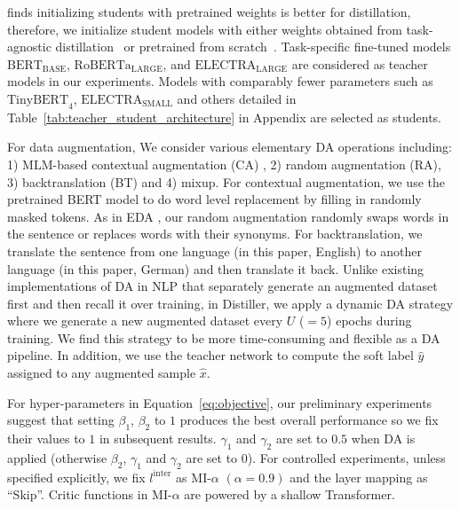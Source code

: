 \documentclass[11pt]{article}
\begin{document}
\citet{turc2019well} finds initializing students with pretrained weights is better for distillation, therefore, we initialize student models with either weights obtained from task-agnostic  distillation~\citep{jiao2019tinybert} or pretrained from scratch~\citep{turc2019well}. Task-specific fine-tuned models $\text{BERT}_\text{BASE}$, $\text{RoBERTa}_\text{LARGE}$, and $\text{ELECTRA}_\text{LARGE}$ are considered as teacher models in our experiments. Models with comparably fewer parameters such as $\text{TinyBERT}_4$, $\text{ELECTRA}_\text{SMALL}$ and others detailed in Table~\ref{tab:teacher_student_architecture} in Appendix are selected as students.

For data augmentation, We consider various elementary DA operations including: 1) MLM-based contextual augmentation (CA) , 2) random augmentation (RA), 3) backtranslation (BT) and 4) mixup. For contextual augmentation, we use the pretrained BERT model to do word level replacement by filling in randomly masked tokens. As in EDA  \citep{wei2019eda}, our random augmentation randomly swaps words in the sentence or replaces words with their synonyms. For backtranslation, we translate the sentence from one language (in this paper, English) to another language (in this paper, German) and then translate it back. Unlike existing implementations of DA in NLP that separately generate an augmented dataset first and then recall it over training, in Distiller, we apply a dynamic DA strategy where we generate a new augmented dataset every $U$ ($=5$) epochs during training. We find this strategy to be more time-consuming and flexible as a DA pipeline. In addition, we use the teacher network to compute the soft label $\hat{y}$ assigned to any augmented sample $\hat{x}$.

For hyper-parameters in Equation~\ref{eq:objective}, our preliminary experiments suggest that setting $\beta_1$, $\beta_2$ to $1$ produces the best overall performance so we fix their values to $1$ in subsequent results. $\gamma_1$ and $\gamma_2$ are set to $0.5$ when DA is applied (otherwise $\beta_2$, $\gamma_1$ and $\gamma_2$ are set to $0$). For controlled experiments, unless specified explicitly, we fix ${l^\text{inter}}$ as MI-$\alpha$ $(\alpha=0.9)$ and the layer mapping as ``Skip''. Critic functions in MI-$\alpha$ are powered by a shallow Transformer.  
\end{document}

